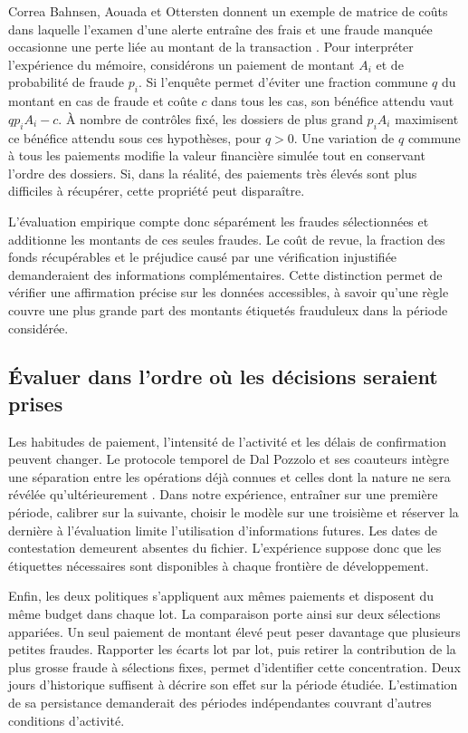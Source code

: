 \documentclass[11pt,a4paper]{article}
\begin{document}
Correa Bahnsen, Aouada et Ottersten donnent un exemple de matrice de coûts dans laquelle l'examen d'une alerte entraîne des frais et une fraude manquée occasionne une perte liée au montant de la transaction \cite{bahnsen2015}. Pour interpréter l'expérience du mémoire, considérons un paiement de montant $A_i$ et de probabilité de fraude $p_i$. Si l'enquête permet d'éviter une fraction commune $q$ du montant en cas de fraude et coûte $c$ dans tous les cas, son bénéfice attendu vaut $q p_i A_i-c$. À nombre de contrôles fixé, les dossiers de plus grand $p_i A_i$ maximisent ce bénéfice attendu sous ces hypothèses, pour $q>0$. Une variation de $q$ commune à tous les paiements modifie la valeur financière simulée tout en conservant l'ordre des dossiers. Si, dans la réalité, des paiements très élevés sont plus difficiles à récupérer, cette propriété peut disparaître.

L'évaluation empirique compte donc séparément les fraudes sélectionnées et additionne les montants de ces seules fraudes. Le coût de revue, la fraction des fonds récupérables et le préjudice causé par une vérification injustifiée demanderaient des informations complémentaires. Cette distinction permet de vérifier une affirmation précise sur les données accessibles, à savoir qu'une règle couvre une plus grande part des montants étiquetés frauduleux dans la période considérée.

\subsection{Évaluer dans l'ordre où les décisions seraient prises}

Les habitudes de paiement, l'intensité de l'activité et les délais de confirmation peuvent changer. Le protocole temporel de Dal Pozzolo et ses coauteurs intègre une séparation entre les opérations déjà connues et celles dont la nature ne sera révélée qu'ultérieurement \cite{dalpozzolo2018}. Dans notre expérience, entraîner sur une première période, calibrer sur la suivante, choisir le modèle sur une troisième et réserver la dernière à l'évaluation limite l'utilisation d'informations futures. Les dates de contestation demeurent absentes du fichier. L'expérience suppose donc que les étiquettes nécessaires sont disponibles à chaque frontière de développement.

Enfin, les deux politiques s'appliquent aux mêmes paiements et disposent du même budget dans chaque lot. La comparaison porte ainsi sur deux sélections appariées. Un seul paiement de montant élevé peut peser davantage que plusieurs petites fraudes. Rapporter les écarts lot par lot, puis retirer la contribution de la plus grosse fraude à sélections fixes, permet d'identifier cette concentration. Deux jours d'historique suffisent à décrire son effet sur la période étudiée. L'estimation de sa persistance demanderait des périodes indépendantes couvrant d'autres conditions d'activité.
\clearpage
\end{document}
